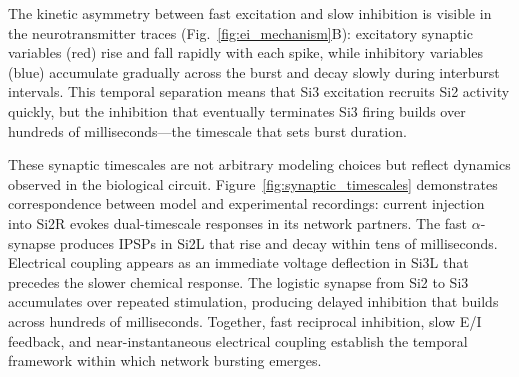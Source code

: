 The kinetic asymmetry between fast excitation and slow inhibition is visible in the neurotransmitter traces (Fig.~\ref{fig:ei_mechanism}B): excitatory synaptic variables (red) rise and fall rapidly with each spike, while inhibitory variables (blue) accumulate gradually across the burst and decay slowly during interburst intervals.
This temporal separation means that Si3 excitation recruits Si2 activity quickly, but the inhibition that eventually terminates Si3 firing builds over hundreds of milliseconds---the timescale that sets burst duration.

These synaptic timescales are not arbitrary modeling choices but reflect dynamics observed in the biological circuit.
Figure~\ref{fig:synaptic_timescales} demonstrates correspondence between model and experimental recordings: current injection into Si2R evokes dual-timescale responses in its network partners.
The fast $\alpha$-synapse produces IPSPs in Si2L that rise and decay within tens of milliseconds.
Electrical coupling appears as an immediate voltage deflection in Si3L that precedes the slower chemical response.
The logistic synapse from Si2 to Si3 accumulates over repeated stimulation, producing delayed inhibition that builds across hundreds of milliseconds.
Together, fast reciprocal inhibition, slow E/I feedback, and near-instantaneous electrical coupling establish the temporal framework within which network bursting emerges.
